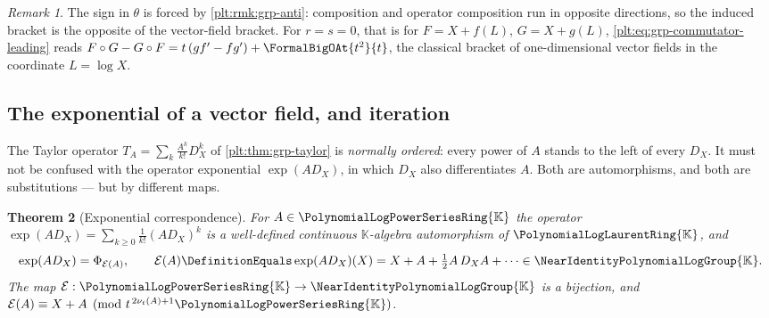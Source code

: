 \documentclass[11pt,oneside]{article}
\theoremstyle{plain}
\newtheorem{theorem}{Theorem}[section]
\theoremstyle{definition}
\theoremstyle{remark}
\newtheorem{remark}[theorem]{Remark}
\newcommand{\K}{\mathbb{K}}
\newcommand{\PLpow}{\PolynomialLogPowerSeriesRing{\K}}   %
\newcommand{\PLlau}{\PolynomialLogLaurentRing{\K}}       %
\newcommand{\Gnear}{\NearIdentityPolynomialLogGroup{\K}} %
\newcommand{\ordt}{\nu_{t}}                              %
\newcommand{\DX}{D_{X}}                                  %
\newcommand{\compose}{\mathbin{\circ}}
\begin{document}
\begin{remark}
The sign in \(\theta\) is forced by \cref{plt:rmk:grp-anti}: composition and
operator composition run in opposite directions, so the induced bracket is the
opposite of the vector-field bracket.  For \(r=s=0\), that is for
\(F=X+f(L)\), \(G=X+g(L)\), \eqref{plt:eq:grp-commutator-leading} reads
\(F\compose G-G\compose F=t\,(gf'-fg')+\FormalBigOAt{t^2}{t}\), the classical
bracket of one-dimensional vector fields in the coordinate \(L=\log X\).
\end{remark}

\subsection{The exponential of a vector field, and iteration}

The Taylor operator \(T_A=\sum_k\frac{A^k}{k!}\DX^k\) of
\cref{plt:thm:grp-taylor} is \emph{normally ordered}: every power of \(A\)
stands to the left of every \(\DX\).  It must not be confused with the
operator exponential \(\exp(A\DX)\), in which \(\DX\) also differentiates
\(A\).  Both are automorphisms, and both are substitutions --- but by
different maps.

\begin{theorem}[Exponential correspondence]\label{plt:thm:grp-exp}
For \(A\in\PLpow\) the operator
\(\exp(A\DX)=\sum_{k\ge0}\frac1{k!}(A\DX)^k\) is a well-defined continuous
\(\K\)-algebra automorphism of \(\PLlau\), and
\begin{equation}\label{plt:eq:grp-exp-is-substitution}
  \exp(A\DX)=\Phi_{\mathcal E(A)},
  \qquad
  \mathcal E(A)\DefinitionEquals\exp(A\DX)(X)
   =X+A+\tfrac12A\,\DX A+\cdots\in\Gnear .
\end{equation}
The map \(\mathcal E:\PLpow\to\Gnear\) is a bijection, and
\(\mathcal E(A)\equiv X+A\pmod{t^{\,2\ordt(A)+1}\PLpow}\).
\end{theorem}
\end{document}
